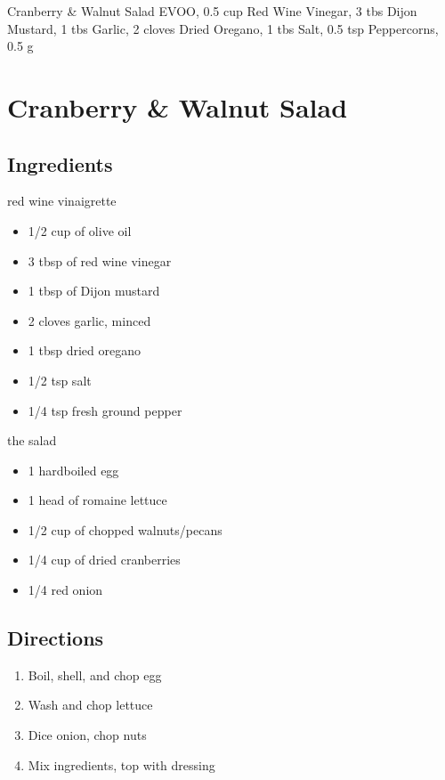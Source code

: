Cranberry & Walnut Salad
  EVOO, 0.5 cup
  Red Wine Vinegar, 3 tbs
  Dijon Mustard, 1 tbs
  Garlic, 2 cloves
  Dried Oregano, 1 tbs
  Salt, 0.5 tsp
  Peppercorns, 0.5 g

\section{ Cranberry \& Walnut Salad }

\subsection{ Ingredients }

red wine vinaigrette

\begin{itemize}
  \item 1/2 cup of olive oil
  \item 3 tbsp of red wine vinegar
  \item 1 tbsp of Dijon mustard
  \item 2 cloves garlic, minced
  \item 1 tbsp dried oregano
  \item 1/2 tsp salt
  \item 1/4 tsp fresh ground pepper
\end{itemize}

the salad

\begin{itemize}
  \item 1 hardboiled egg
  \item 1 head of romaine lettuce
  \item 1/2 cup of chopped walnuts/pecans
  \item 1/4 cup of dried cranberries
  \item 1/4 red onion
\end{itemize}

\subsection{ Directions }

\begin{enumerate}
  \item Boil, shell, and chop egg
  \item Wash and chop lettuce
  \item Dice onion, chop nuts
  \item Mix ingredients, top with dressing
\end{enumerate}
